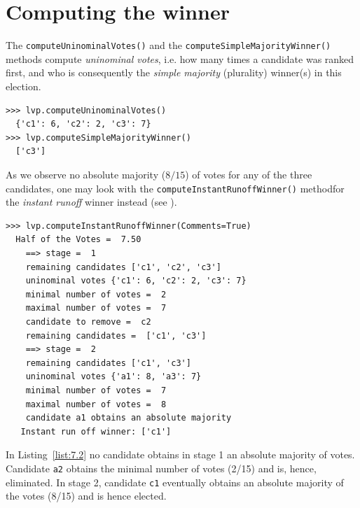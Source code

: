 \section{Computing the winner}
\label{sec:7.2}

The \texttt{computeUninominalVotes()} and the \texttt{computeSimpleMajorityWinner()} methods compute \emph{uninominal votes}, i.e. how many times a candidate was ranked first, and who is consequently the \emph{simple majority} (plurality) winner(s) in this election.
\begin{lstlisting}
>>> lvp.computeUninominalVotes()
  {'c1': 6, 'c2': 2, 'c3': 7}
>>> lvp.computeSimpleMajorityWinner()
  ['c3']
\end{lstlisting}

As we observe no absolute majority ($8/15$) of votes for any of the three candidates, one may look with the \texttt{computeInstantRunoffWinner()} methodfor the \emph{instant runoff} winner instead (see \citet{ADT-L2}).
\begin{lstlisting}[caption={Example Instant Run Off Winner},label=list:7.2]
>>> lvp.computeInstantRunoffWinner(Comments=True)
  Half of the Votes =  7.50
    ==> stage =  1
	remaining candidates ['c1', 'c2', 'c3']
	uninominal votes {'c1': 6, 'c2': 2, 'c3': 7}
	minimal number of votes =  2
	maximal number of votes =  7
	candidate to remove =  c2
	remaining candidates =  ['c1', 'c3']
    ==> stage =  2
	remaining candidates ['c1', 'c3']
	uninominal votes {'a1': 8, 'a3': 7}
	minimal number of votes =  7
	maximal number of votes =  8
	candidate a1 obtains an absolute majority
   Instant run off winner: ['c1']
 \end{lstlisting}
In Listing~\vref{list:7.2} no candidate obtains in stage 1 an absolute majority of votes. Candidate \texttt{a2} obtains the minimal number of votes (2/15) and is, hence, eliminated. In stage 2, candidate \texttt{c1} eventually obtains an absolute majority of the votes (8/15) and is hence elected.

